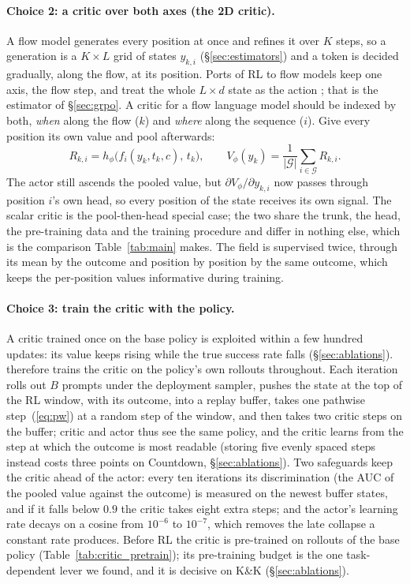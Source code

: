 \paragraph{Choice 2: a critic over both axes (the 2D critic).}
A flow model generates every position at once and refines it over $K$ steps, so a generation is a $K\times L$ grid of states $y_{k,i}$ (\S\ref{sec:estimators}) and a token is decided gradually, along the flow, at its position. Ports of RL to flow models keep one axis, the flow step, and treat the whole $L\times d$ state as the action \citep{liu2025flowgrpo,xue2025dancegrpo}; that is the estimator of \S\ref{sec:grpo}. A critic for a flow language model should be indexed by both, \emph{when} along the flow ($k$) and \emph{where} along the sequence ($i$). Give every position its own value and pool afterwards:
\begin{equation}
R_{k,i}=h_\phi\big(f_i(y_k,t_k,c),\,t_k\big),\qquad V_\phi(y_k)=\frac1{|\mathcal G|}\sum_{i\in\mathcal G}R_{k,i}.
\label{eq:critic2d}
\end{equation}
The actor still ascends the pooled value, but $\partial V_\phi/\partial y_{k,i}$ now passes through position $i$'s own head, so every position of the state receives its own signal. The scalar critic is the pool-then-head special case; the two share the trunk, the head, the pre-training data and the training procedure and differ in nothing else, which is the comparison Table~\ref{tab:main} makes. The field is supervised twice, through its mean by the outcome and position by position by the same outcome, which keeps the per-position values informative during training.

\paragraph{Choice 3: train the critic with the policy.}
A critic trained once on the base policy is exploited within a few hundred updates: its value keeps rising while the true success rate falls (\S\ref{sec:ablations}). \jpc{} therefore trains the critic on the policy's own rollouts throughout. Each iteration rolls out $B$ prompts under the deployment sampler, pushes the state at the top of the RL window, with its outcome, into a replay buffer, takes one pathwise step~(\ref{eq:pw}) at a random step of the window, and then takes two critic steps on the buffer; critic and actor thus see the same policy, and the critic learns from the step at which the outcome is most readable (storing five evenly spaced steps instead costs three points on Countdown, \S\ref{sec:ablations}). Two safeguards keep the critic ahead of the actor: every ten iterations its discrimination (the AUC of the pooled value against the outcome) is measured on the newest buffer states, and if it falls below $0.9$ the critic takes eight extra steps; and the actor's learning rate decays on a cosine from $10^{-6}$ to $10^{-7}$, which removes the late collapse a constant rate produces. Before RL the critic is pre-trained on rollouts of the base policy (Table~\ref{tab:critic_pretrain}); its pre-training budget is the one task-dependent lever we found, and it is decisive on K\&K (\S\ref{sec:ablations}).

